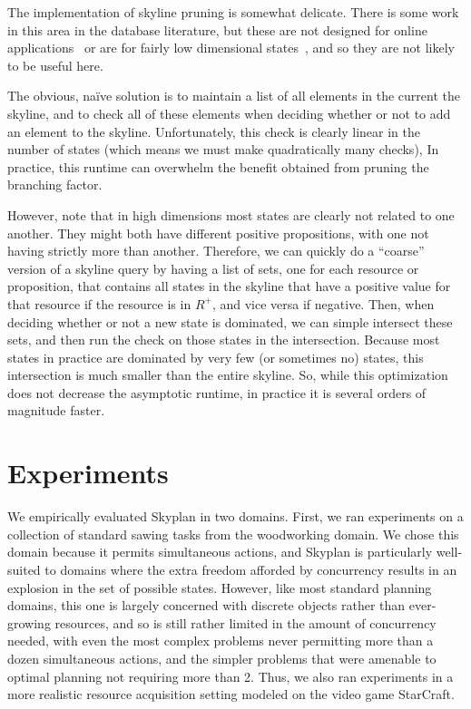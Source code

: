 \documentclass[letterpaper]{article}
\theoremstyle{plain} \newtheorem{theorem}{Theorem} \newtheorem{proposition}{Proposition} \newtheorem{lemma}{Lemma}
\theoremstyle{definition} \newtheorem{definition}{Definition} \newtheorem{conjecture}{Conjecture} \newtheorem*{example}{Example}
\theoremstyle{remark} \newtheorem*{remark}{Remark} \newtheorem*{note}{Note} \newtheorem{case}{Case}
\begin{document}
The implementation of skyline pruning is somewhat delicate.  There
is some work in this area in the database literature, but these are
not designed for online applications~\citep{skylineoperator,tan01efficient}
or are for fairly low dimensional states~\citep{KossmannRR02}, and
so they are not likely to be useful here.

The obvious, na\"ive solution is to maintain a list of all elements
in the current the skyline, and to check all of these elements when
deciding whether or not to add an element to the skyline. Unfortunately,
this check is clearly linear in the number of states (which means
we must make quadratically many checks), In practice, this
runtime can overwhelm the benefit obtained from pruning the branching factor.

However, note that in high dimensions most states are clearly not
related to one another.  They might both have different positive
propositions, with one not having strictly more than another.
Therefore, we can quickly do a ``coarse'' version of a skyline query
by having a list of sets, one for each resource or proposition,
that contains all states in the skyline that have a positive value
for that resource if the resource is in $R^+$, and
vice versa if negative. Then, when deciding whether or not a new
state is dominated, we can simple intersect these sets, and then
run the check on those states in the intersection. Because most
states in practice are dominated by very few (or sometimes no)
states, this intersection is much smaller than the entire skyline.
So, while this optimization does not decrease the asymptotic runtime,
in practice it is several orders of magnitude faster.



\section{Experiments}

We empirically evaluated Skyplan in two domains. First, we ran experiments on a collection
of standard sawing tasks from the woodworking domain. We chose this domain because it
permits simultaneous actions, and Skyplan is particularly well-suited to domains where the
extra freedom afforded by concurrency results in an explosion in the set of possible
states. However, like most standard planning domains, this one is largely concerned with
discrete objects rather than ever-growing resources, and so is still rather limited in the
amount of concurrency needed, with even the most complex problems never permitting more
than a dozen simultaneous actions, and the simpler problems that were amenable to optimal
planning not requiring more than 2. Thus, we also ran experiments in a more realistic
resource acquisition setting modeled on the video game StarCraft.
\end{document}
